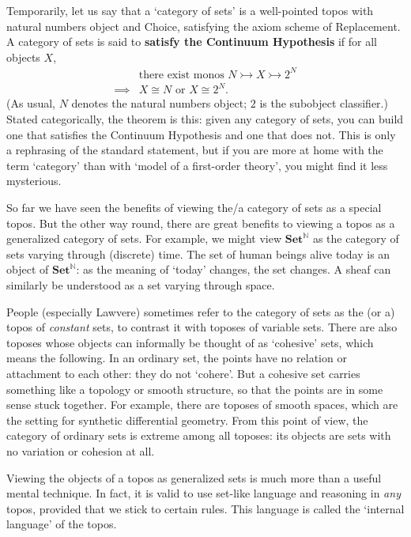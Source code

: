 \documentclass[12pt]{article}
\newcommand{\fcat}[1]{\mathbf{#1}}
\newcommand{\Set}{\fcat{Set}}
\newcommand{\demph}[1]{\textbf{\textup{#1}}}
\newcommand{\iso}{\cong}
\newcommand{\nat}{\mathbb{N}}
\newcommand{\monic}{\rightarrowtail}
\begin{document}
Temporarily, let us say that a `category of sets' is a well-pointed topos with
natural numbers object and Choice, satisfying the axiom scheme of Replacement.
A category of sets is said to \demph{satisfy the Continuum Hypothesis} if for
all objects $X$,
% 
\begin{align*}
                &\text{there exist monos } N \monic X \monic 2^N        \\
\implies        &X \iso N \text{ or } X \iso 2^N.
\end{align*}
% 
(As usual, $N$ denotes the natural numbers object; $2$ is the subobject
classifier.)  Stated categorically, the theorem is this: given any category of
sets, you can build one that satisfies the Continuum Hypothesis and one that
does not.  This is only a rephrasing of the standard statement, but if you are
more at home with the term `category' than with `model of a first-order
theory', you might find it less mysterious.

So far we have seen the benefits of viewing the/a category of sets as a
special topos.  But the other way round, there are great benefits to viewing a
topos as a generalized category of sets.  For example, we might view
$\Set^\nat$ as the category of sets varying through (discrete) time.  The set
of human beings alive today is an object of $\Set^\nat$: as the meaning of
`today' changes, the set changes.  A sheaf can similarly be understood as a
set varying through space.

People (especially Lawvere) sometimes refer to the category of sets as the (or
a) topos of \emph{constant} sets, to contrast it with toposes of variable
sets.  There are also toposes whose objects can informally be thought of as
`cohesive' sets, which means the following.  In an ordinary set, the points
have no relation or attachment to each other: they do not `cohere'.  But a
cohesive set carries something like a topology or smooth structure, so that
the points are in some sense stuck together.  For example, there are toposes of
smooth spaces, which are the setting for synthetic differential geometry.
From this point of view, the category of ordinary sets is extreme among all
toposes: its objects are sets with no variation or cohesion at all.

Viewing the objects of a topos as generalized sets is much more than a useful
mental technique.  In fact, it is valid to use set-like language and reasoning
in \emph{any} topos, provided that we stick to certain rules.  This language
is called the `internal language' of the topos.  
\end{document}
